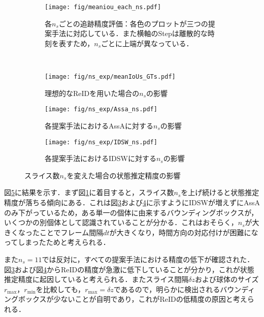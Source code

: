     \begin{figure}[t]
        \begin{subfigure}[b]{\linewidth}
            \centering
            \texttt{[image: fig/meaniou\_each\_ns.pdf]}
            \caption[各$n_s$ごとの追跡精度評価]{各$n_s$ごとの追跡精度評価：各色のプロットが三つの提案手法に対応している．また横軸のStepは離散的な時刻を表すため，$n_s$ごとに上端が異なっている．}
            \label{fig:meaniou_each_ns}
        \end{subfigure}
        \\
        \begin{subfigure}[b]{0.32\linewidth}
            \centering
            \texttt{[image: fig/ns\_exp/meanIoUs\_GTs.pdf]}
            \caption[理想的なReIDを用いた場合の$n_s$の影響]{理想的なReIDを用いた場合の$n_s$の影響}
            \label{fig:ideal_reid_ns_effect}
        \end{subfigure}
        \hfill
        \begin{subfigure}[b]{0.32\linewidth}
            \centering
            \texttt{[image: fig/ns\_exp/Assa\_ns.pdf]}
            \caption[各提案手法におけるAssAに対する$n_s$の影響]{各提案手法におけるAssAに対する$n_s$の影響}
            \label{fig:ns_effect_on_assa}
        \end{subfigure}
        \hfill
        \begin{subfigure}[b]{0.32\linewidth}
            \centering
            \texttt{[image: fig/ns\_exp/IDSW\_ns.pdf]}
            \caption[各提案手法におけるIDSWに対する$n_s$の影響]{各提案手法におけるIDSWに対する$n_s$の影響}
            \label{fig:ns_effect_on_idsw}
        \end{subfigure}
        \caption[スライス数$n_s$を変えた場合の状態推定精度の影響]{スライス数$n_s$を変えた場合の状態推定精度の影響}
        \label{fig:ns_effect}
    \end{figure}

    図\ref{fig:ns_effect}に結果を示す．まず図\ref{fig:meaniou_each_ns}に着目すると，スライス数$n_s$を上げ続けると状態推定精度が落ちる傾向にある．これは図\ref{fig:ns_effect_on_assa}および\ref{fig:ns_effect_on_idsw}に示すようにIDSWが増えずにAssAのみ下がっているため，ある単一の個体に由来するバウンディングボックスが，いくつかの別個体として認識されていることが分かる．これはおそらく，$n_s$が大きくなったことでフレーム間隔$dt$が大きくなり，時間方向の対応付けが困難になってしまったためと考えられる．

    また$n_s = 11$では反対に，すべての提案手法における精度の低下が確認された．図\ref{fig:ns_effect_on_assa}および図\ref{fig:ns_effect_on_idsw}からReIDの精度が急激に低下していることが分かり，これが状態推定精度に起因していると考えられる．またスライス間隔$\delta z$および球体のサイズ$r_{\text{max}}$，$r_{\text{min}}$を比較しても，$r_{\text{max}} = \delta z$であるので，明らかに検出されるバウンディングボックスが少ないことが自明であり，これがReIDの低精度の原因と考えられる．

